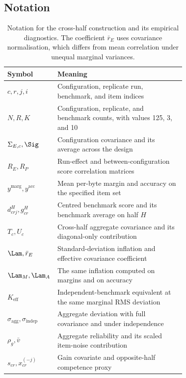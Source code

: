 \subsection{Notation}
\begin{table}[h]
\centering
\caption{Notation for the cross-half construction and its empirical diagnostics. The coefficient $\bar r_E$ uses covariance normalisation, which differs from mean correlation under unequal marginal variances.}\label{tab:notation}
\small\setlength{\tabcolsep}{4pt}\renewcommand{\arraystretch}{1.12}
\begin{tabular}{lL{0.72\linewidth}}
\toprule
Symbol & Meaning\\
\midrule
$c,r,j,i$ & Configuration, replicate run, benchmark, and item indices\\
$N,R,K$ & Configuration, replicate, and benchmark counts, with values 125, 3, and 10\\
$\Sigma_{E,c},\Sig$ & Configuration covariance and its average across the design\\
$R_E,R_P$ & Run-effect and between-configuration score correlation matrices\\
$y^{\mathrm{marg}},y^{\mathrm{acc}}$ & Mean per-byte margin and accuracy on the specified item set\\
$d^H_{crj},g^H_{cr}$ & Centred benchmark score and its benchmark average on half $H$\\
$T_c,U_c$ & Cross-half aggregate covariance and its diagonal-only contribution\\
$\Lam,\bar r_E$ & Standard-deviation inflation and effective covariance coefficient\\
$\Lam_M,\Lam_A$ & The same inflation computed on margins and on accuracy\\
$K_{\mathrm{eff}}$ & Independent-benchmark equivalent at the same marginal RMS deviation\\
$\sigma_{\mathrm{agg}},\sigma_{\mathrm{indep}}$ & Aggregate deviation with full covariance and under independence\\
$\rho_g,\bar v$ & Aggregate reliability and its scaled item-noise contribution\\
$s_{cr},x_{cr}^{(-j)}$ & Gain covariate and opposite-half competence proxy\\
\bottomrule
\end{tabular}
\end{table}

